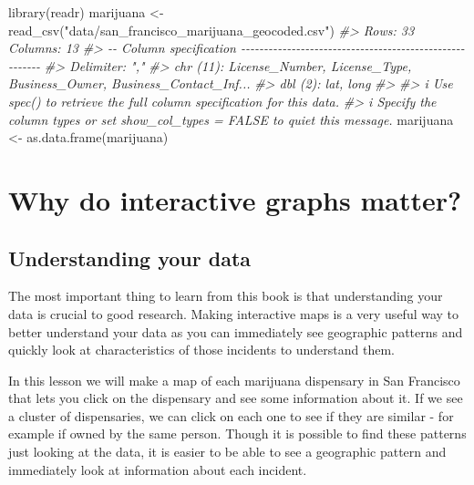 \documentclass[
]{krantz}
\makeatletter
\newenvironment{Shaded}{\begin{snugshade}}{\end{snugshade}}
\newcommand{\CommentTok}[1]{\textcolor[rgb]{0.37,0.37,0.37}{\textit{#1}}}
\newcommand{\FunctionTok}[1]{\textcolor[rgb]{0,0,0}{#1}}
\newcommand{\NormalTok}[1]{#1}
\newcommand{\OtherTok}[1]{\textcolor[rgb]{0.37,0.37,0.37}{#1}}
\newcommand{\StringTok}[1]{\textcolor[rgb]{0.5,0.5,0.5}{#1}}
\newenvironment{kframe}{%
\medskip{}
\setlength{\fboxsep}{.8em}
 \def\at@end@of@kframe{}%
 \ifinner\ifhmode%
  \def\at@end@of@kframe{\end{minipage}}%
  \begin{minipage}{\columnwidth}%
 \fi\fi%
 \def\FrameCommand##1{\hskip\@totalleftmargin \hskip-\fboxsep
 \colorbox{shadecolor}{##1}\hskip-\fboxsep
     \hskip-\linewidth \hskip-\@totalleftmargin \hskip\columnwidth}%
 \MakeFramed {\advance\hsize-\width
   \@totalleftmargin\z@ \linewidth\hsize
   \@setminipage}}%
 {\par\unskip\endMakeFramed%
 \at@end@of@kframe}
\renewenvironment{Shaded}{\begin{kframe}}{\end{kframe}}
\makeatother
\begin{document}
\begin{Shaded}
\begin{Highlighting}[]
\FunctionTok{library}\NormalTok{(readr)}
\NormalTok{marijuana }\OtherTok{\textless{}{-}} \FunctionTok{read\_csv}\NormalTok{(}\StringTok{"data/san\_francisco\_marijuana\_geocoded.csv"}\NormalTok{)}
\CommentTok{\#\textgreater{} Rows: 33 Columns: 13}
\CommentTok{\#\textgreater{} {-}{-} Column specification {-}{-}{-}{-}{-}{-}{-}{-}{-}{-}{-}{-}{-}{-}{-}{-}{-}{-}{-}{-}{-}{-}{-}{-}{-}{-}{-}{-}{-}{-}{-}{-}{-}{-}{-}{-}{-}{-}{-}{-}{-}{-}{-}{-}{-}{-}{-}{-}{-}{-}{-}{-}{-}{-}{-}{-}}
\CommentTok{\#\textgreater{} Delimiter: ","}
\CommentTok{\#\textgreater{} chr (11): License\_Number, License\_Type, Business\_Owner, Business\_Contact\_Inf...}
\CommentTok{\#\textgreater{} dbl  (2): lat, long}
\CommentTok{\#\textgreater{} }
\CommentTok{\#\textgreater{} i Use \textasciigrave{}spec()\textasciigrave{} to retrieve the full column specification for this data.}
\CommentTok{\#\textgreater{} i Specify the column types or set \textasciigrave{}show\_col\_types = FALSE\textasciigrave{} to quiet this message.}
\NormalTok{marijuana }\OtherTok{\textless{}{-}} \FunctionTok{as.data.frame}\NormalTok{(marijuana)}
\end{Highlighting}
\end{Shaded}

\hypertarget{why-do-interactive-graphs-matter}{%
\section{Why do interactive graphs matter?}\label{why-do-interactive-graphs-matter}}

\hypertarget{understanding-your-data}{%
\subsection{Understanding your data}\label{understanding-your-data}}

The most important thing to learn from this book is that understanding your data is crucial to good research. Making interactive maps is a very useful way to better understand your data as you can immediately see geographic patterns and quickly look at characteristics of those incidents to understand them.

In this lesson we will make a map of each marijuana dispensary in San Francisco that lets you click on the dispensary and see some information about it. If we see a cluster of dispensaries, we can click on each one to see if they are similar - for example if owned by the same person. Though it is possible to find these patterns just looking at the data, it is easier to be able to see a geographic pattern and immediately look at information about each incident.
\end{document}
